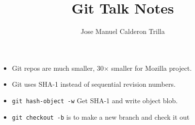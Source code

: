 \documentclass{article}
\author{Jose Manuel Calderon Trilla}
\title{Git Talk Notes}
\begin{document}
\maketitle

    \begin{itemize}
        \item Git repos are much smaller, 30$\times$ smaller for Mozilla
            project.
        \item Git uses SHA-1 instead of sequential revision numbers.
        \item \verb=git hash-object -w= Get SHA-1 and write object blob.
        \item \verb=git checkout -b= is to make a new branch and check it out
    \end{itemize}
\end{document}

